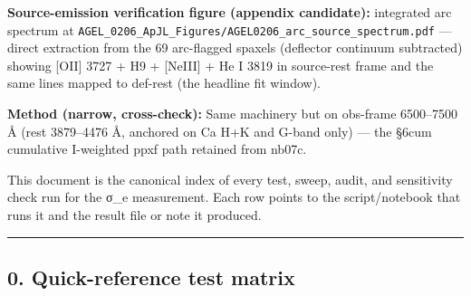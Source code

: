 \documentclass[
  10pt,
]{article}
\begin{document}
\textbf{Source-emission verification figure (appendix candidate):} integrated arc spectrum at \texttt{AGEL\_0206\_ApJL\_Figures/AGEL0206\_arc\_source\_spectrum.pdf} --- direct extraction from the 69
arc-flagged spaxels (deflector continuum subtracted) showing {[}OII{]} 3727 + H9 + {[}NeIII{]} + He I 3819 in source-rest frame and the same lines mapped to def-rest (the headline fit window).

\textbf{Method (narrow, cross-check):} Same machinery but on obs-frame 6500--7500 Å (rest 3879--4476 Å, anchored on Ca H+K and G-band only) --- the §6cum cumulative I-weighted ppxf path retained from
nb07c.

This document is the canonical index of every test, sweep, audit, and sensitivity check run for the σ\_e measurement. Each row points to the script/notebook that runs it and the result file or note it
produced.

\begin{center}\rule{0.5\linewidth}{0.5pt}\end{center}

\hypertarget{quick-reference-test-matrix}{%
\subsection{0. Quick-reference test matrix}\label{quick-reference-test-matrix}}
\end{document}
